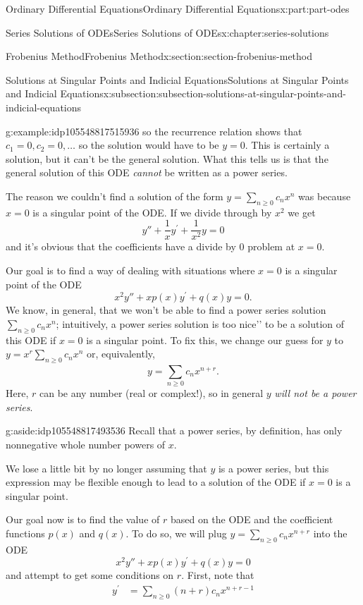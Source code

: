 \documentclass[twoside,10pt,]{book}
\numberwithin{equation}{part}
\newcommand{\amp}{&}
\begin{document}
\begin{partptx}{Ordinary Differential Equations}{}{Ordinary Differential Equations}{}{}{x:part:part-odes}
\begin{chapterptx}{Series Solutions of ODEs}{}{Series Solutions of ODEs}{}{}{x:chapter:series-solutions}
\begin{sectionptx}{Frobenius Method}{}{Frobenius Method}{}{}{x:section:section-frobenius-method}
\begin{subsectionptx}{Solutions at Singular Points and Indicial Equations}{}{Solutions at Singular Points and Indicial Equations}{}{}{x:subsection:subsection-solutions-at-singular-points-and-indicial-equations}
\begin{example}{}{g:example:idp105548817515936}
so the recurrence relation shows that \(c_{1} = 0, c_{2} = 0,\ldots\) so the solution would have to be \(y=0\). This is certainly a solution, but it can't be the general solution. What this tells us is that the general solution of this ODE \emph{cannot} be written as a power series.%
\end{example}
The reason we couldn't find a solution of the form \(y=\sum_{n\geq0}^{}c_{n}x^{n}\) was because \(x=0\) is a singular point of the ODE. If we divide through by \(x^{2}\) we get%
\begin{equation*}
y''+\frac{1}{x}y^\prime+\frac{1}{x^{2}}y = 0
\end{equation*}
and it's obvious that the coefficients have a divide by \(0\) problem at \(x=0\).%
\par
Our goal is to find a way of dealing with situations where \(x=0\) is a singular point of the ODE%
\begin{equation*}
x^{2}y''+xp(x)y^\prime+q(x)y=0.
\end{equation*}
We know, in general, that we won't be able to find a power series solution \(\sum_{n\geq0}^{}c_{n}x^{n}\); intuitively, a power series solution is too \textasciigrave{}\textasciigrave{}nice'{}'{} to be a solution of this ODE if \(x=0\) is a singular point. To fix this, we change our guess for \(y\) to \(y=x^{r}\sum_{n\geq0}^{}c_{n}x^{n}\) or, equivalently,%
\begin{equation*}
y = \sum_{n\geq0}^{}c_{n}x^{n+r}.
\end{equation*}
Here, \(r\) can be any number (real or complex!), so in general \(y\) \emph{will not be a power series}. \begin{aside}{}{g:aside:idp105548817493536}%
Recall that a power series, by definition, has only nonnegative whole number powers of \(x\).%
\end{aside}
 We lose a little bit by no longer assuming that \(y\) is a power series, but this expression may be flexible enough to lead to a solution of the ODE if \(x=0\) is a singular point.%
\par
Our goal now is to find the value of \(r\) based on the ODE and the coefficient functions \(p(x)\) and \(q(x)\). To do so, we will plug \(y=\sum_{n\geq0}^{}c_{n}x^{n+r}\) into the ODE%
\begin{equation*}
x^{2}y''+xp(x)y^\prime+q(x)y = 0
\end{equation*}
and attempt to get some conditions on \(r\). First, note that%
\begin{align*}
y^\prime \amp= \sum_{n\geq0}^{}(n+r)c_{n}x^{n+r-1}\\

\end{align*}
\end{subsectionptx}
\end{sectionptx}
\end{chapterptx}
\end{partptx}
\end{document}
